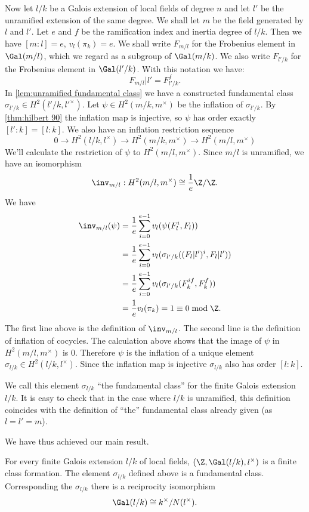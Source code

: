 Now let $l/k$ be a Galois extension of local fields of degree $n$ and let $l'$ be
the unramified extension of the same degree.
We shall let $m$ be the field generated by $l$ and $l'$.
Let $e$ and $f$ be the ramification index and inertia degree of $l/k$.
Then we have $[m:l] = e$, $v_l(\pi_k)= e$.
We shall write $F_{m/l}$ for the Frobenius element in $\Gal(m/l)$, which we regard as a subgroup
of $\Gal(m/k)$. We also write $F_{l'/k}$ for the Frobenius element in $\Gal(l'/k)$.
With this notation we have:
\[
	F_{m/l}|l' = F_{l'/k}^f.
\]
In \ref{lem:unramified fundamental class} we have a constructed fundamental class
$\sigma_{l'/k} \in H^2(l'/k,l'^\times)$.
Let $\psi\in H^2(m/k,m^\times)$ be the inflation of $\sigma_{l'/k}$.
By \ref{thm:hilbert 90} the inflation map is injective,
so $\psi$ has order exactly $[l':k] = [l:k]$.
We also have an inflation restriction sequence
\[
	0 \to H^2(l/k, l^\times) \to H^2(m/k , m^\times) \to H^2(m/l, m^\times)
\]
We'll calculate the restriction of $\psi$ to $H^2(m/l, m^\times)$.
Since $m/l$ is unramified, we have an isomorphism
\[
	\inv_{m/l} : H^2(m/l, m^\times) \cong \frac{1}{e}\Z/ \Z.
\]
We have
\begin{align*}
	\inv_{m/l}(\psi)
	&=\frac{1}{e} \sum_{i=0}^{e-1} v_l (\psi (F_l^i,F_l))\\
	&=\frac{1}{e} \sum_{i=0}^{e-1} v_l (\sigma_{l'/k}((F_l|l')^i,F_l|l'))\\
	&=\frac{1}{e} \sum_{i=0}^{e-1} v_l (\sigma_{l'/k}(F_k^{if},F_k^f))\\
	&=\frac{1}{e} v_l (\pi_k) = 1 \equiv 0 \bmod \Z.
\end{align*}
The first line above is the definition of $\inv_{m/l}$.
The second line is the definition of inflation of cocycles.
The calculation above shows that the image of $\psi$ in $H^2(m/l, m^\times)$ is $0$.
Therefore $\psi$ is the inflation of a unique element $\sigma_{l/k} \in H^2(l/k,l^\times)$.
Since the inflation map is injective $\sigma_{l/k}$ also has order $[l:k]$.

We call this element $\sigma_{l/k}$ ``the fundamental class'' for the finite Galois extension
$l/k$. It is easy to check that in the case where $l/k$ is unramified, this definition coincides
with the definition of ``the'' fundamental class already given (as $l=l'=m$).

We have thus achieved our main result.

\begin{theorem} \label{thm:local fund class}
	For every finite Galois extension $l/k$ of local fields, $(\Z,\Gal(l/k),l^\times)$ is a finite
	class formation. The element $\sigma_{l/k}$ defined above is a fundamental class.
	Corresponding the $\sigma_{l/k}$ there is a reciprocity isomorphism
	\[
		\Gal(l/k) \cong k^\times / N(l^\times).
	\]
\end{theorem}

